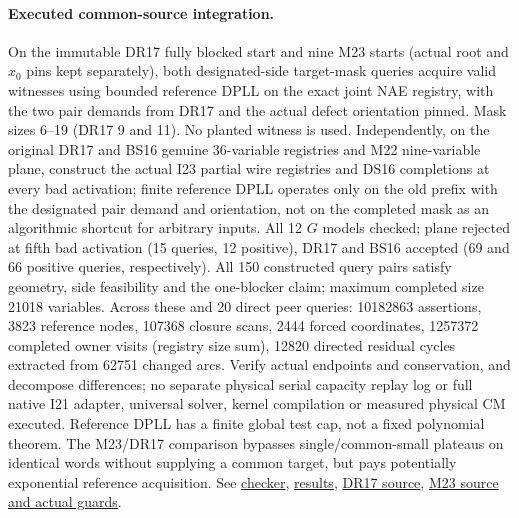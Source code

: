 \documentclass[11pt]{article}
\begin{document}
\paragraph{Executed common-source integration.}
On the immutable DR17 fully blocked start and nine M23 starts (actual root and $x_0$ pins kept separately), both designated-side target-mask queries acquire valid witnesses using bounded reference DPLL on the exact joint NAE registry, with the two pair demands from DR17 and the actual defect orientation pinned. Mask sizes 6--19 (DR17 9 and 11). No planted witness is used. Independently, on the original DR17 and BS16 genuine 36-variable registries and M22 nine-variable plane, construct the actual I23 partial wire registries and DS16 completions at every bad activation; finite reference DPLL operates only on the old prefix with the designated pair demand and orientation, not on the completed mask as an algorithmic shortcut for arbitrary inputs. All 12 $G$ models checked; plane rejected at fifth bad activation (15 queries, 12 positive), DR17 and BS16 accepted (69 and 66 positive queries, respectively). All 150 constructed query pairs satisfy geometry, side feasibility and the one-blocker claim; maximum completed size 21018 variables. Across these and 20 direct peer queries: 10182863 assertions, 3823 reference nodes, 107368 closure scans, 2444 forced coordinates, 1257372 completed owner visits (registry size sum), 12820 directed residual cycles extracted from 62751 changed arcs. Verify actual endpoints and conservation, and decompose differences; no separate physical serial capacity replay log or full native I21 adapter, universal solver, kernel compilation or measured physical CM executed. Reference DPLL has a finite global test cap, not a fixed polynomial theorem. The M23/DR17 comparison bypasses single/common-small plateaus on identical words without supplying a common target, but pays potentially exponential reference acquisition. See \href{https://github.com/j15marti/pnp/commit/974e41bcf8d019f78b3f17783c9d9d782dd09ca9}{checker}, \href{https://github.com/j15marti/pnp/commit/05c719019a55777a9fc2f6c91b9b4faaf63089d7}{results}, \href{https://github.com/j15marti/pnp/commit/af8584879409ad3364795d50902f02b5a030bd2a}{DR17 source}, \href{https://github.com/j15marti/pnp/commit/a412bf23a0b63f03c886b7bf5bd50217b5502db2}{M23 source and actual guards}.
\end{document}
